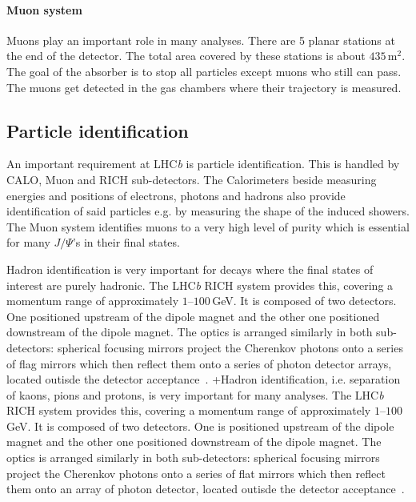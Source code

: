 \documentclass[11pt,twoside]{scrreprt}
\begin{document}
\paragraph{Muon system}
Muons play an important role in many analyses. There are 5 planar stations at the end of the detector. The total area covered by these 
stations is about $435$\,m$^2$. The goal of the absorber is to stop all particles except muons who still can pass. The muons get detected 
in the gas chambers where their trajectory is measured.


\subsection{Particle identification} %
\label{sub:particle_identification}

An important requirement at LHC\textit{b} is particle identification. This is handled by CALO, Muon and RICH sub-detectors. The 
Calorimeters beside measuring energies and positions of electrons, photons and hadrons also provide identification of said particles e.g.
by measuring the shape of the induced showers. The Muon system identifies muons to a very high level of purity which is essential for 
many \(J/\Psi\)'s in their final states.
        
Hadron identification is very important for decays where the final states of interest are purely hadronic. The LHC\textit{b} RICH system 
provides this, covering a momentum range of approximately $1$--$100$\,GeV. It is composed of two detectors. One positioned upstream of the 
dipole magnet and the other one positioned downstream of the dipole magnet. The optics is arranged similarly in both sub-detectors: 
spherical focusing mirrors project the Cherenkov photons onto a series of flag mirrors which then reflect them onto a series of photon 
detector arrays, located outisde the detector acceptance~\cite{Powell:2011}.    +Hadron identification, i.e. separation of kaons, pions 
and protons, is very important for many analyses. The LHC\textit{b} RICH system provides this, covering a momentum range of approximately 
$1$--$100$\,GeV. It is composed of two detectors. One is positioned upstream of the dipole magnet and the other one positioned downstream 
of the dipole magnet. The optics is arranged similarly in both sub-detectors: spherical focusing mirrors project the Cherenkov photons 
onto a series of flat mirrors which then reflect them onto an array of photon detector, located outisde the detector 
acceptance~\cite{Powell:2011}.
\end{document}
